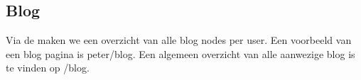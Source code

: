 \subsection{Blog}\label{blog}

Via de  maken we een overzicht van alle blog nodes per user. Een voorbeeld van een blog pagina is peter/blog. Een algemeen overzicht van alle aanwezige blog is te vinden op /blog. 